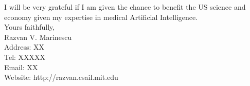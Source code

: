 \documentclass[11pt]{article}
\begin{document}
I will be very grateful if I am given the chance to benefit the US science and economy given my expertise in medical Artificial Intelligence.\\


Yours faithfully,\\

\vspace{1.5em}
Razvan V. Marinescu\\

Address: XX\\
Tel: XXXXX\\
Email: XX\\
Website: http://razvan.csail.mit.edu


\pagebreak


\renewcommand\refname{List of Exhibits}
\end{document}
